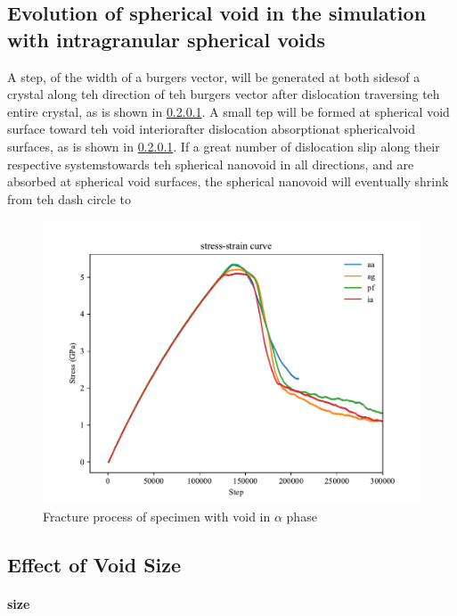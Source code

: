 \documentclass[times]{elsarticle}
\begin{document}

\subsection{Evolution of spherical void in the simulation with intragranular spherical voids}
A step, of the width of a burgers vector, will be generated at both sidesof a crystal along teh direction of teh burgers vector after dislocation traversing teh entire crystal, as is shown in \ref{}. A small tep will be formed at spherical void surface toward teh void interiorafter dislocation absorptionat sphericalvoid surfaces, as is shown in \ref{}. If a great number of dislocation slip along their respective systemstowards teh spherical nanovoid in all directions, and are absorbed at spherical void surfaces, the spherical nanovoid will eventually shrink from teh dash circle to




\begin{figure}[h]
	\centering
	\includegraphics[width=0.7\linewidth]{img/allline}
	\caption{Fracture process of specimen with void in $\alpha$ phase}
	\label{ }
\end{figure}




\subsection{Effect of Void Size}
\paragraph{size}
 
\end{document}
